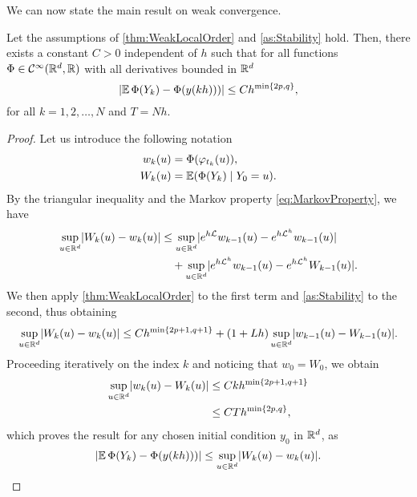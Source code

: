 \documentclass[10pt]{article}
\begin{document}
We can now state the main result on weak convergence. 

\begin{theorem}\label{thm:weakOrder} Let the assumptions of \cref{thm:WeakLocalOrder} and \cref{as:Stability} hold. Then, there exists a constant $C > 0$ independent of $h$ such that for all functions $\Phi \in \mathcal{C}^\infty(\mathbb{R}^d,\mathbb{R})$ with all derivatives bounded in $\mathbb{R}^d$
	\begin{equation}\label{eq:weakOrder}
		\lvert\operatorname{\mathbb{E}}\Phi(Y_k) - \Phi(y(kh)))\rvert \leq Ch^{\min\{2p, q\}},
	\end{equation}
	for all $k = 1, 2, \ldots, N$ and $T = Nh$.
\end{theorem}
	
\begin{proof} Let us introduce the following notation
	\begin{equation}
		\begin{aligned}
			w_k(u) &= \Phi(\varphi_{t_k}(u)),\\
			W_k(u) &= \operatorname{\mathbb{E}}(\Phi(Y_k) \mid Y_0 = u).
		\end{aligned}
	\end{equation}
	By the triangular inequality and the Markov property \eqref{eq:MarkovProperty}, we have
	\begin{equation}
		\begin{aligned}
			\sup_{u\in\mathbb{R}^d}\lvert W_k(u) - w_k(u)\rvert &\leq \sup_{u\in\mathbb{R}^d}\lvert e^{h\mathcal{L}}w_{k-1}(u) - e^{h\mathcal{L}^h}w_{k-1}(u)\rvert \\
			&\quad + \sup_{u\in\mathbb{R}^d}\lvert e^{h\mathcal{L}^h}w_{k-1}(u) - e^{h\mathcal{L}^h}W_{k-1}(u)\rvert.
		\end{aligned}
	\end{equation}
	We then apply \cref{thm:WeakLocalOrder} to the first term and \cref{as:Stability} to the second, thus obtaining
	\begin{equation}
		\sup_{u\in\mathbb{R}^d}\lvert W_k(u) - w_k(u)\rvert \leq Ch^{\min\{2p+1, q + 1\}} + (1 + Lh)\sup_{u\in\mathbb{R}^d}\lvert w_{k-1}(u) - W_{k-1}(u)\rvert.
	\end{equation}
	Proceeding iteratively on the index $k$ and noticing that $w_0 = W_0$, we obtain
	\begin{equation}
		\begin{aligned}
			\sup_{u\in\mathbb{R}^d}\lvert w_k(u) - W_k(u)\rvert &\leq C k h^{\min\{2p+1, q + 1\}}\\
			&\leq C T h^{\min\{2p, q\}},	
		\end{aligned}
	\end{equation}
	which proves the result for any chosen initial condition $y_0$ in $\mathbb{R}^d$, as
	\begin{equation}
		\lvert\operatorname{\mathbb{E}}\Phi(Y_k) - \Phi(y(kh)))\rvert \leq \sup_{u\in\mathbb{R}^d}\lvert W_k(u) - w_k(u)\rvert.
	\end{equation}
\end{proof}
\end{document}
